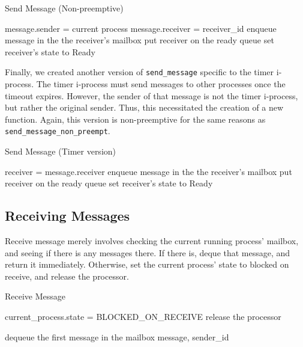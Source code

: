 \documentclass[12pt]{report}
\begin{document}
\begin{algorithm}[H]
	\caption{Send Message (Non-preemptive)}
	\begin{algorithmic}[1]
			\State message.sender = current process
			\State message.receiver = receiver_id
			\State enqueue message in the the receiver's mailbox
				\State put receiver on the ready queue
				\State set receiver's state to Ready
			\EndIf
		\EndFunction
	\end{algorithmic}
\end{algorithm}


Finally, we created another version of \texttt{send_message} specific to the timer i-process. The timer i-process must send messages to other processes once the timeout expires. However, the sender of that message is not the timer i-process, but rather the original sender. Thus, this necessitated the creation of a new function. Again, this version is non-preemptive for the same reasons as \texttt{send_message_non_preempt}.

\begin{algorithm}[H]
	\caption{Send Message (Timer version)}
	\begin{algorithmic}[1]
			\State receiver = message.receiver
			\State enqueue message in the the receiver's mailbox
				\State put receiver on the ready queue
				\State set receiver's state to Ready
			\EndIf
		\EndFunction
	\end{algorithmic}
\end{algorithm}

\subsection{Receiving Messages}

Receive message merely involves checking the current running process' mailbox, and seeing if there is any messages there. If there is, deque that message, and return it immediately. Otherwise, set the current process' state to blocked on receive, and release the processor.

\begin{algorithm}[H]
	\caption{Receive Message}
	\begin{algorithmic}[1]
				\State current_process.state = BLOCKED_ON_RECEIVE
				\State release the processor
			\EndWhile

			\State dequeue the first message in the mailbox
			\State\Return message, sender_id
		\EndFunction
	\end{algorithmic}
\end{algorithm}
\end{document}
